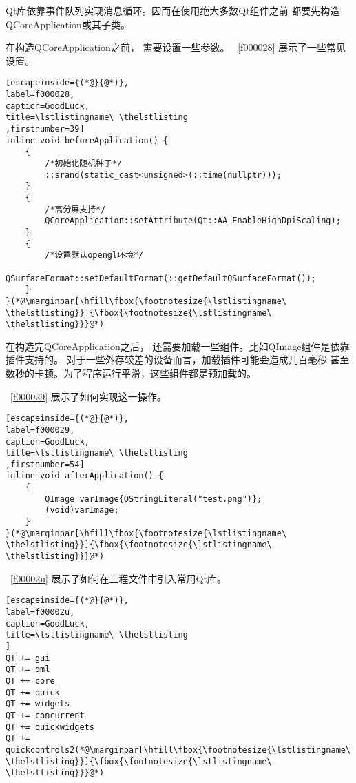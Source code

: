 Qt库依靠事件队列实现消息循环。因而在使用绝大多数Qt组件之前
都要先构造QCoreApplication或其子类。

在构造QCoreApplication之前，
需要设置一些参数。
\lstlistingname\ \ref{f000028}
展示了一些常见设置。

\FloatBarrier
\begin{lstlisting}[escapeinside={(*@}{@*)},
label=f000028,
caption=GoodLuck,
title=\lstlistingname\ \thelstlisting
,firstnumber=39]
inline void beforeApplication() {
    {
        /*初始化随机种子*/
        ::srand(static_cast<unsigned>(::time(nullptr)));
    }
    {
        /*高分屏支持*/
        QCoreApplication::setAttribute(Qt::AA_EnableHighDpiScaling);
    }
    {
        /*设置默认opengl环境*/
        QSurfaceFormat::setDefaultFormat(::getDefaultQSurfaceFormat());
    }
}(*@\marginpar[\hfill\fbox{\footnotesize{\lstlistingname\ \thelstlisting}}]{\fbox{\footnotesize{\lstlistingname\ \thelstlisting}}}@*)\end{lstlisting}          %

在构造完QCoreApplication之后，
还需要加载一些组件。比如QImage组件是依靠插件支持的。
对于一些外存较差的设备而言，加载插件可能会造成几百毫秒
甚至数秒的卡顿。为了程序运行平滑，这些组件都是预加载的。

\lstlistingname\ \ref{f000029}
展示了如何实现这一操作。

\FloatBarrier
\begin{lstlisting}[escapeinside={(*@}{@*)},
label=f000029,
caption=GoodLuck,
title=\lstlistingname\ \thelstlisting
,firstnumber=54]
inline void afterApplication() {
    {
        QImage varImage{QStringLiteral("test.png")};
        (void)varImage;
    }
}(*@\marginpar[\hfill\fbox{\footnotesize{\lstlistingname\ \thelstlisting}}]{\fbox{\footnotesize{\lstlistingname\ \thelstlisting}}}@*)\end{lstlisting}          %

\lstlistingname\ \ref{f00002u}
展示了如何在工程文件中引入常用Qt库。

\FloatBarrier
\begin{lstlisting}[escapeinside={(*@}{@*)},
label=f00002u,
caption=GoodLuck,
title=\lstlistingname\ \thelstlisting
]
QT += gui
QT += qml
QT += core
QT += quick
QT += widgets
QT += concurrent
QT += quickwidgets
QT += quickcontrols2(*@\marginpar[\hfill\fbox{\footnotesize{\lstlistingname\ \thelstlisting}}]{\fbox{\footnotesize{\lstlistingname\ \thelstlisting}}}@*)\end{lstlisting}          %

